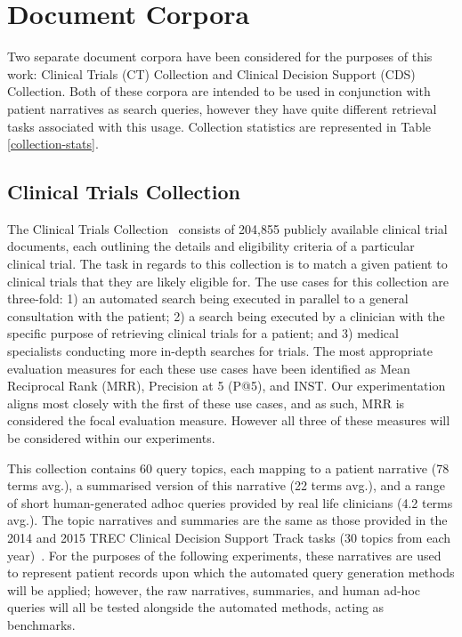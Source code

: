 \documentclass[a4paper]{report}
\begin{document}
\section{Document Corpora}
Two separate document corpora have been considered for the purposes of this work: Clinical Trials (CT) Collection and Clinical Decision Support (CDS) Collection. Both of these corpora are intended to be used in conjunction with patient narratives as search queries, however they have quite different retrieval tasks associated with this usage. Collection statistics are represented in Table \ref{collection-stats}.

\subsection{Clinical Trials Collection}
The Clinical Trials Collection~\citep{Koopman2016A-Test-Collecti} consists of 204,855 publicly available clinical trial documents, each outlining the details and eligibility criteria of a particular clinical trial. The task in regards to this collection is to match a given patient to clinical trials that they are likely eligible for. The use cases for this collection are three-fold: 1) an automated search being executed in parallel to a general consultation with the patient; 2) a search being executed by a clinician with the specific purpose of retrieving clinical trials for a patient; and 3) medical specialists conducting more in-depth searches for trials. The most appropriate evaluation measures for each these use cases have been identified as Mean Reciprocal Rank (MRR), Precision at 5 (P@5), and INST. Our experimentation aligns most closely with the first of these use cases, and as such, MRR is considered the focal evaluation measure. However all three of these measures will be considered within our experiments.

This collection contains 60 query topics, each mapping to a patient narrative (78 terms avg.), a summarised version of this narrative (22 terms avg.), and a range of short human-generated adhoc queries provided by real life clinicians (4.2 terms avg.). The topic narratives and summaries are the same as those provided in the 2014 and 2015 TREC Clinical Decision Support Track tasks (30 topics from each year)~\cite{Roberts2015Overview-of-the}. For the purposes of the following experiments, these narratives are used to represent patient records upon which the automated query generation methods will be applied; however, the raw narratives, summaries, and human ad-hoc queries will all be tested alongside the automated methods, acting as benchmarks.
\end{document}
